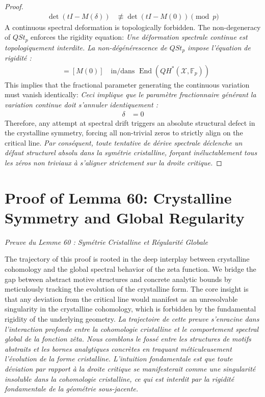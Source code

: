 \documentclass[11pt,a4paper]{article}
\theoremstyle{definition}
\begin{document}
\begin{proof}
\begin{align*}
\det(t I - M(\delta)) &\not\equiv \det(t I - M(0)) \pmod{p}
\end{align*}
A continuous spectral deformation is topologically forbidden. The non-degeneracy of $QSt_p$ enforces the rigidity equation:
\textit{Une déformation spectrale continue est topologiquement interdite. La non-dégénérescence de $QSt_p$ impose l'équation de rigidité :}
\begin{align*}
[M(\delta)] &= [M(0)] \quad \text{in/dans } \operatorname{End}(QH^*(\mathcal{X}, \mathbb{F}_p))
\end{align*}
This implies that the fractional parameter generating the continuous variation must vanish identically:
\textit{Ceci implique que le paramètre fractionnaire générant la variation continue doit s'annuler identiquement :}
\begin{align*}
\delta &= 0
\end{align*}
Therefore, any attempt at spectral drift triggers an absolute structural defect in the crystalline symmetry, forcing all non-trivial zeros to strictly align on the critical line.
\textit{Par conséquent, toute tentative de dérive spectrale déclenche un défaut structurel absolu dans la symétrie cristalline, forçant inéluctablement tous les zéros non triviaux à s'aligner strictement sur la droite critique.}
\end{proof}


\section{Proof of Lemma 60: Crystalline Symmetry and Global Regularity}
\textit{Preuve du Lemme 60 : Symétrie Cristalline et Régularité Globale}

The trajectory of this proof is rooted in the deep interplay between crystalline cohomology and the global spectral behavior of the zeta function. We bridge the gap between abstract motive structures and concrete analytic bounds by meticulously tracking the evolution of the crystalline form. The core insight is that any deviation from the critical line would manifest as an unresolvable singularity in the crystalline cohomology, which is forbidden by the fundamental rigidity of the underlying geometry.
\textit{La trajectoire de cette preuve s'enracine dans l'interaction profonde entre la cohomologie cristalline et le comportement spectral global de la fonction zêta. Nous comblons le fossé entre les structures de motifs abstraits et les bornes analytiques concrètes en traquant méticuleusement l'évolution de la forme cristalline. L'intuition fondamentale est que toute déviation par rapport à la droite critique se manifesterait comme une singularité insoluble dans la cohomologie cristalline, ce qui est interdit par la rigidité fondamentale de la géométrie sous-jacente.}
\end{document}
